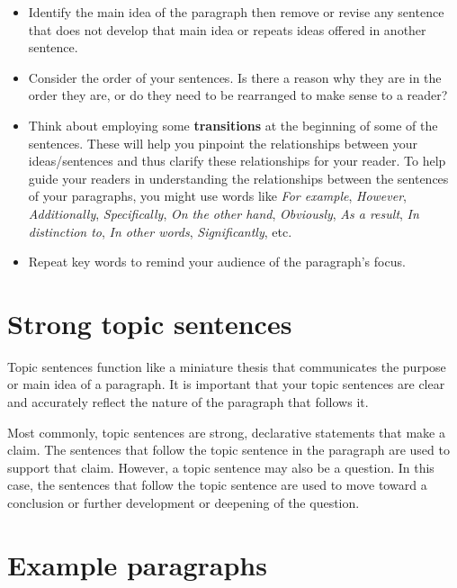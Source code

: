 \begin{itemize}

\item Identify the main idea of the paragraph then remove or revise any sentence that does not 
develop that main idea or repeats ideas offered in another sentence.

\item Consider the order of your sentences. Is there a reason why they are in the order 
they are, or do they need to be rearranged to make sense to a reader?

\item Think about employing some \textbf{transitions} at the beginning 
of some of the sentences. These will help you pinpoint the relationships between your 
ideas/sentences and thus clarify these relationships for your reader. To help guide your readers in understanding the relationships between the sentences of your paragraphs, you might use words like \emph{For example}, \emph{However}, \emph{Additionally}, \emph{Specifically}, \emph{On the other hand}, \emph{Obviously}, \emph{As a result}, \emph{In distinction to}, \emph{In other words}, \emph{Significantly}, etc.

\item Repeat key words to remind your audience of the paragraph's focus.

\end{itemize}
 
\section{Strong topic sentences}
Topic sentences function like a miniature thesis that communicates the purpose or main idea of a paragraph. It is important that your topic sentences are clear and accurately reflect the nature of the paragraph that follows it. 

Most commonly, topic sentences are strong, declarative statements that make a claim. The sentences that follow the topic sentence in the paragraph are used to support that claim. However, a topic sentence may also be a question. In this case, the sentences that follow the topic sentence are used to move toward a conclusion or further development or deepening of the question. 
 
\section{Example paragraphs}

